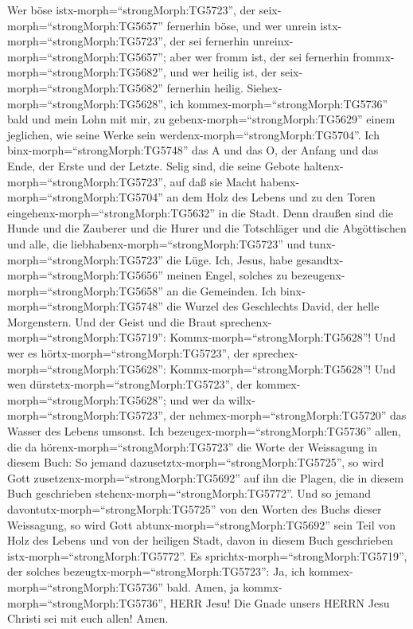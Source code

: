  Wer böse istx-morph=``strongMorph:TG5723'', der
seix-morph=``strongMorph:TG5657'' fernerhin böse, und wer unrein
istx-morph=``strongMorph:TG5723'', der sei fernerhin
unreinx-morph=``strongMorph:TG5657''; aber wer fromm ist, der sei
fernerhin frommx-morph=``strongMorph:TG5682'', und wer heilig ist, der
seix-morph=``strongMorph:TG5682'' fernerhin heilig. 
Siehex-morph=``strongMorph:TG5628'', ich
kommex-morph=``strongMorph:TG5736'' bald und mein Lohn mit mir, zu
gebenx-morph=``strongMorph:TG5629'' einem jeglichen, wie seine Werke
sein werdenx-morph=``strongMorph:TG5704''.  Ich
binx-morph=``strongMorph:TG5748'' das A und das O, der Anfang und das
Ende, der Erste und der Letzte.  Selig sind, die seine
Gebote haltenx-morph=``strongMorph:TG5723'', auf daß sie Macht
habenx-morph=``strongMorph:TG5704'' an dem Holz des Lebens und zu den
Toren eingehenx-morph=``strongMorph:TG5632'' in die Stadt. 
Denn draußen sind die Hunde und die Zauberer und die Hurer und die
Totschläger und die Abgöttischen und alle, die
liebhabenx-morph=``strongMorph:TG5723'' und
tunx-morph=``strongMorph:TG5723'' die Lüge.  Ich, Jesus,
habe gesandtx-morph=``strongMorph:TG5656'' meinen Engel, solches zu
bezeugenx-morph=``strongMorph:TG5658'' an die Gemeinden. Ich
binx-morph=``strongMorph:TG5748'' die Wurzel des Geschlechts David, der
helle Morgenstern.  Und der Geist und die Braut
sprechenx-morph=``strongMorph:TG5719'':
Kommx-morph=``strongMorph:TG5628''! Und wer es
hörtx-morph=``strongMorph:TG5723'', der
sprechex-morph=``strongMorph:TG5628'':
Kommx-morph=``strongMorph:TG5628''! Und wen
dürstetx-morph=``strongMorph:TG5723'', der
kommex-morph=``strongMorph:TG5628''; und wer da
willx-morph=``strongMorph:TG5723'', der
nehmex-morph=``strongMorph:TG5720'' das Wasser des Lebens umsonst.
 Ich bezeugex-morph=``strongMorph:TG5736'' allen, die da
hörenx-morph=``strongMorph:TG5723'' die Worte der Weissagung in diesem
Buch: So jemand dazusetztx-morph=``strongMorph:TG5725'', so wird Gott
zusetzenx-morph=``strongMorph:TG5692'' auf ihn die Plagen, die in diesem
Buch geschrieben stehenx-morph=``strongMorph:TG5772''.  Und
so jemand davontutx-morph=``strongMorph:TG5725'' von den Worten des
Buchs dieser Weissagung, so wird Gott
abtunx-morph=``strongMorph:TG5692'' sein Teil von Holz des Lebens und
von der heiligen Stadt, davon in diesem Buch geschrieben
istx-morph=``strongMorph:TG5772''.  Es
sprichtx-morph=``strongMorph:TG5719'', der solches
bezeugtx-morph=``strongMorph:TG5723'': Ja, ich
kommex-morph=``strongMorph:TG5736'' bald. Amen, ja
kommx-morph=``strongMorph:TG5736'', HERR Jesu!  Die Gnade
unsers HERRN Jesu Christi sei mit euch allen! Amen.

